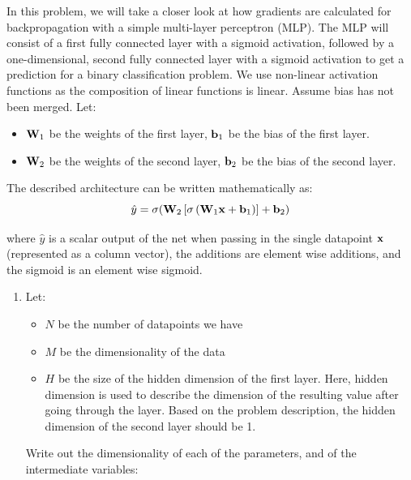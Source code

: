 \documentclass[submit]{../harvardml}
\begin{document}
\newpage


\begin{problem}

In this problem, we will take a closer look at how gradients are calculated for backpropagation with a simple multi-layer perceptron (MLP). The MLP will consist of a first fully connected layer with a sigmoid activation, followed by a one-dimensional, second fully connected layer with a sigmoid activation to get a prediction for a binary classification problem. We use non-linear activation functions as the composition of linear functions is linear. Assume bias has not been merged. Let:
\begin{itemize}
  \item $\bold{W}_1$ be the weights of the first layer, $\bold{b}_1$ be the bias of the first layer.
  \item $\bold{W}_2$ be the weights of the second layer, $\bold{b}_2$ be the bias of the second layer.
\end{itemize}

The described architecture can be written mathematically as: $$\hat{y} = \sigma(\bold{W}_2 \left[\sigma \left(\bold{W}_1 \bold{x} + \bold{b}_1\right)\right] + \bold{b}_2)$$

where $\hat{y}$ is a scalar output of the net when passing in the single datapoint $\bold{x}$ (represented as a column vector), the additions are element wise additions, and the sigmoid is an element wise sigmoid.

\begin{enumerate}
  \item Let:
        \begin{itemize}
          \item $N$ be the number of datapoints we have
          \item $M$ be the dimensionality of the data
          \item $H$ be the size of the hidden dimension of the first layer. Here, hidden dimension is used to describe the dimension of the resulting value after going through the layer. Based on the problem description, the hidden dimension of the second layer should be 1.
        \end{itemize}

        Write out the dimensionality of each of the parameters, and of the intermediate variables:


\end{enumerate}
\end{problem}
\end{document}
